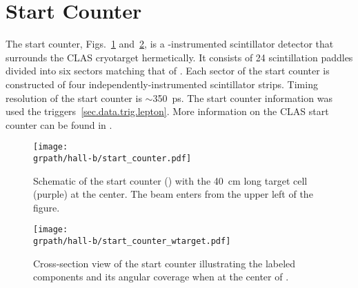 \section{Start Counter}\label{sec:clas.st}

The start counter, Figs.~\ref{fig:clas.st} and~\ref{fig:clas.stxsection}, is a -instrumented scintillator detector that surrounds the CLAS cryotarget hermetically. It consists of 24 scintillation paddles divided into six sectors matching that of . Each sector of the start counter is constructed of four independently-instrumented scintillator strips. Timing resolution of the start counter is $\sim$350~ps. The start counter information was used the  triggers~\ref{sec.data.trig.lepton}. More information on the CLAS start counter can be found in \cite{clas.st}.

\begin{figure}[h!]\begin{center}
\texttt{[image: \\grpath/hall-b/start\_counter.pdf]}
\caption[Schematic of the start counter () with the 40~cm long target cell (purple) at the center]{\label{fig:clas.st}{}Schematic of the start counter () with the 40~cm long target cell (purple) at the center. The beam enters from the upper left of the figure.}
\end{center}\end{figure}

\begin{figure}[h!]\begin{center}
\texttt{[image: \\grpath/hall-b/start\_counter\_wtarget.pdf]}
\caption[Cross-section view of the start counter illustrating the labeled components and its angular coverage when at the center of ]{\label{fig:clas.stxsection}{}Cross-section view of the start counter illustrating the labeled components and its angular coverage when at the center of .}
\end{center}\end{figure}

